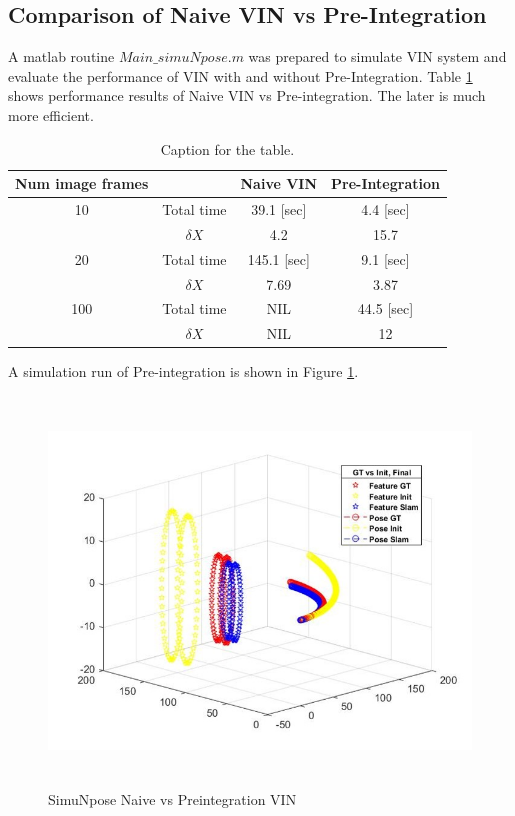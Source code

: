 \documentclass[12pt]{article}   %
\begin{document}
\subsection{Comparison of Naive VIN vs Pre-Integration}
A matlab routine $Main\_simuNpose.m$ was prepared to simulate VIN system and evaluate the performance of VIN with and without Pre-Integration.
Table \ref{tab:table1} shows performance results of Naive VIN vs Pre-integration. The later is much more efficient.
\begin{table}[h!]
	\centering
	\caption{Caption for the table.}
	\label{tab:table1}
	\begin{tabular}{cc|c|c}
		Num image frames &  & Naive VIN & Pre-Integration\\
		\hline
		10 & Total time & 39.1 [sec] & 4.4 [sec]\\
		{} & $\delta X$ & 4.2 & 15.7\\
		\hline
		20 & Total time & 145.1 [sec] & 9.1 [sec]\\
		{} & $\delta X$ & 7.69 & 3.87\\
		\hline
		100 & Total time & NIL & 44.5 [sec]\\
		{} & $\delta X$ & NIL & 12\\		
	\end{tabular}
\end{table}

A simulation run of Pre-integration is shown in Figure \ref{fig:simuNpose}. \\
\begin{figure}[ht]
	\label{fig:simuNpose}
	\includegraphics[height=10.3cm]{figures/SimuNpose_simData.jpg}
	\caption{SimuNpose Naive vs Preintegration VIN}
\end{figure}
\end{document}
